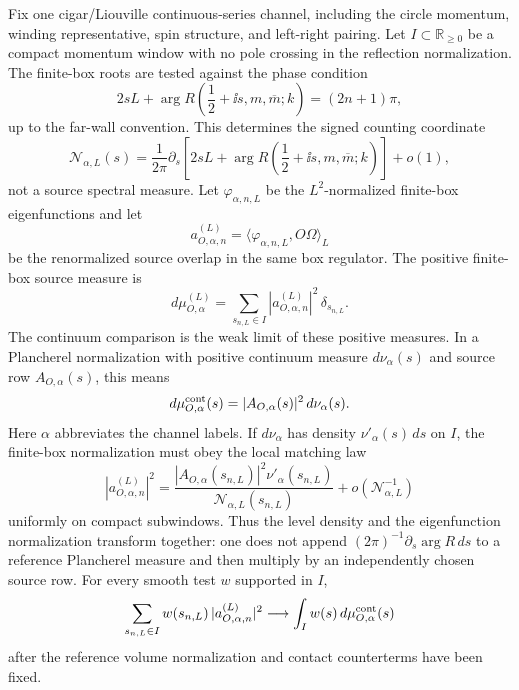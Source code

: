 \begin{construction}
\label{constr:cigar-liouville-source-spectral-resolution}
Fix one cigar/Liouville continuous-series channel, including the circle
momentum, winding representative, spin structure, and left-right pairing.
Let \(I\subset\mathbb R_{\ge0}\) be a compact momentum window with no pole
crossing in the reflection normalization.  The finite-box roots are tested
against the phase condition
\[
  2sL+\arg R\!\left(\frac12+\ii s,m,\overline m;k\right)
  =(2n+1)\pi ,
\]
up to the far-wall convention.  This determines the signed counting
coordinate
\[
  {\mathcal N}_{\alpha,L}(s)
  =
  \frac1{2\pi}\partial_s
  \left[
    2sL+\arg R\!\left(\frac12+\ii s,m,\overline m;k\right)
  \right]
  +o(1),
\]
not a source spectral measure.  Let
\(\varphi_{\alpha,n,L}\) be the \(L^2\)-normalized finite-box eigenfunctions
and let
\[
  a^{(L)}_{O,\alpha,n}
  =
  \langle \varphi_{\alpha,n,L},O\Omega\rangle_L
\]
be the renormalized source overlap in the same box regulator.  The positive
finite-box source measure is
\[
  d\mu^{(L)}_{O,\alpha}
  =
  \sum_{s_{n,L}\in I}
  |a^{(L)}_{O,\alpha,n}|^2\,\delta_{s_{n,L}} .
\]
The continuum comparison is the weak limit of these positive measures.  In a
Plancherel normalization with positive continuum measure \(d\nu_\alpha(s)\)
and source row \(A_{O,\alpha}(s)\), this means
\begin{equation}
  d\mu^{\rm cont}_{O,\alpha}(s)
  =
  |A_{O,\alpha}(s)|^2\,d\nu_\alpha(s).
  \label{eq:cigar-liouville-source-spectral-measure}
\end{equation}
Here \(\alpha\) abbreviates the channel labels.  If \(d\nu_\alpha\) has density
\(\nu'_\alpha(s)\,ds\) on \(I\), the finite-box normalization must obey the
local matching law
\[
  |a^{(L)}_{O,\alpha,n}|^2
  =
  \frac{|A_{O,\alpha}(s_{n,L})|^2
    \nu'_\alpha(s_{n,L})}
       {{\mathcal N}_{\alpha,L}(s_{n,L})}
  +o({\mathcal N}_{\alpha,L}^{-1})
\]
uniformly on compact subwindows.  Thus the level density and the eigenfunction
normalization transform together: one does not append
\((2\pi)^{-1}\partial_s\arg R\,ds\) to a reference Plancherel measure and then
multiply by an independently chosen source row.  For every smooth test \(w\)
supported in \(I\),
\[
  \sum_{s_{n,L}\in I}
    w(s_{n,L})\,|a^{(L)}_{O,\alpha,n}|^2
  \longrightarrow
  \int_I w(s)\,d\mu^{\rm cont}_{O,\alpha}(s)
\]
after the reference volume normalization and contact counterterms have been
fixed.


\end{construction}
